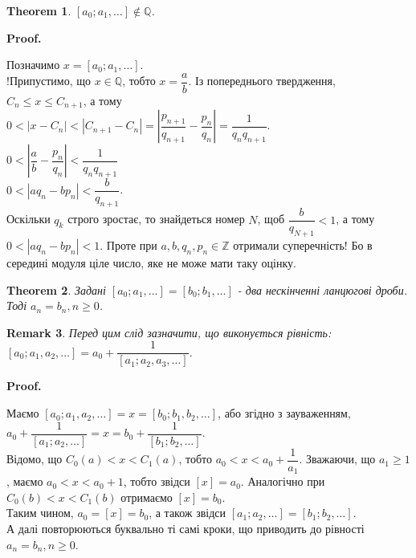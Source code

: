 \documentclass[a4paper, 14pt]{extarticle}
\makeatletter
\theoremstyle{theoremdd}
\newtheorem{theorem}{Theorem}[subsection]
\theoremstyle{theoremdd}
\theoremstyle{theoremdd}
\theoremstyle{theoremdd}
\theoremstyle{theoremdd}
\theoremstyle{theoremdd}
\newtheorem{remark}[theorem]{Remark}
\theoremstyle{theoremdd}
\theoremstyle{theoremdd}
\def\qed{$\blacksquare$}
\renewenvironment{proof}[1][Proof.\\]{\par
\pushQED{\hfill \qed}%
\normalfont \topsep6\p@\@plus6\p@\relax
\trivlist
\item\relax
{\bfseries
#1\@addpunct{.}}\hspace\labelsep\ignorespaces
}{%
\popQED\endtrivlist\@endpefalse
}
\makeatother
\begin{document}
\begin{theorem}
$[a_0;a_1,\dots] \not\in \mathbb{Q}$.
\end{theorem}

\begin{proof}
Позначимо $x = [a_0;a_1,\dots]$.\\
!Припустимо, що $x \in \mathbb{Q}$, тобто $x = \dfrac{a}{b}$. Із попереднього твердження, $C_n \leq x \leq C_{n+1}$, а тому\\
$0 < |x-C_n| < |C_{n+1}-C_n| = \left| \dfrac{p_{n+1}}{q_{n+1}} - \dfrac{p_n}{q_n} \right| = \dfrac{1}{q_n q_{n+1}}$.\\
$0 < \left| \dfrac{a}{b} - \dfrac{p_n}{q_n} \right| < \dfrac{1}{q_n q_{n+1}}$\\
$0 < |aq_n - bp_n| < \dfrac{b}{q_{n+1}}$.\\
Оскільки $q_k$ строго зростає, то знайдеться номер $N$, щоб $\dfrac{b}{q_{N+1}} < 1$, а тому $0 < |aq_n - bp_n| < 1$. Проте при $a,b,q_n,p_n \in \mathbb{Z}$ отримали суперечність! Бо в середині модуля ціле число, яке не може мати таку оцінку.
\end{proof}

\begin{theorem}
Задані $[a_0;a_1,\dots] = [b_0;b_1,\dots]$ - два нескінченні ланцюгові дроби. Тоді $a_n = b_n, n \geq 0$.
\end{theorem}

\begin{remark}
Перед цим слід зазначити, що виконується рівність:\\
$[a_0;a_1,a_2,\dots] = a_0 + \dfrac{1}{[a_1;a_2,a_3,\dots]}$.
\end{remark}

\begin{proof}
Маємо $[a_0;a_1,a_2,\dots] = x = [b_0;b_1,b_2,\dots]$, або згідно з зауваженням,\\
$a_0 + \dfrac{1}{[a_1;a_2,\dots]} = x = b_0 + \dfrac{1}{[b_1;b_2,\dots]}$.\\
Відомо, що $C_0(a) < x < C_1(a)$, тобто $a_0 < x < a_0 + \dfrac{1}{a_1}$. Зважаючи, що $a_1 \geq 1$, маємо $a_0 < x < a_0+1$, тобто звідси $[x] = a_0$. Аналогічно при $C_0(b) < x < C_1(b)$ отримаємо $[x] = b_0$.\\
Таким чином, $a_0 = [x] = b_0$, а також звідси $[a_1;a_2,\dots] = [b_1;b_2,\dots]$.\\
А далі повторюються буквально ті самі кроки, що приводить до рівності $a_n = b_n, n \geq 0$.
\end{proof}
\end{document}

